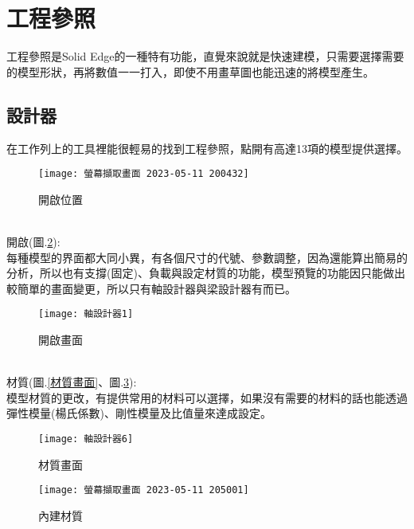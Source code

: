 \newpage


\section{工程參照}

工程參照是Solid Edge的一種特有功能，直覺來說就是快速建模，只需要選擇需要的模型形狀，再將數值一一打入，即使不用畫草圖也能迅速的將模型產生。\\

\subsection{設計器}

在工作列上的工具裡能很輕易的找到工程參照，點開有高達13項的模型提供選擇。\\
\begin{figure}[hbt!]
\begin{center}
\texttt{[image: 螢幕擷取畫面 2023-05-11 200432]}
\caption{\Large 開啟位置}\label{開啟位置}
\end{center}
\end{figure}
\\
開啟(圖.\ref{開啟畫面}):\\

每種模型的界面都大同小異，有各個尺寸的代號、參數調整，因為還能算出簡易的分析，所以也有支撐(固定)、負載與設定材質的功能，模型預覽的功能因只能做出較簡單的畫面變更，所以只有軸設計器與梁設計器有而已。\\
\begin{figure}[hbt!]
\begin{center}
\texttt{[image: 軸設計器1]}
\caption{\Large 開啟畫面}\label{開啟畫面}
\end{center}
\end{figure}
\\
材質(圖.\ref{材質畫面}、圖.\ref{內建材質}):\\

模型材質的更改，有提供常用的材料可以選擇，如果沒有需要的材料的話也能透過彈性模量(楊氏係數)、剛性模量及比值量來達成設定。\\
\begin{figure}[hbt!]
\begin{center}
\texttt{[image: 軸設計器6]}
\caption{\Large 材質畫面}\label{材質畫面}
\texttt{[image: 螢幕擷取畫面 2023-05-11 205001]}
\caption{\Large 內建材質}\label{內建材質}
\end{center}
\end{figure}
\\


